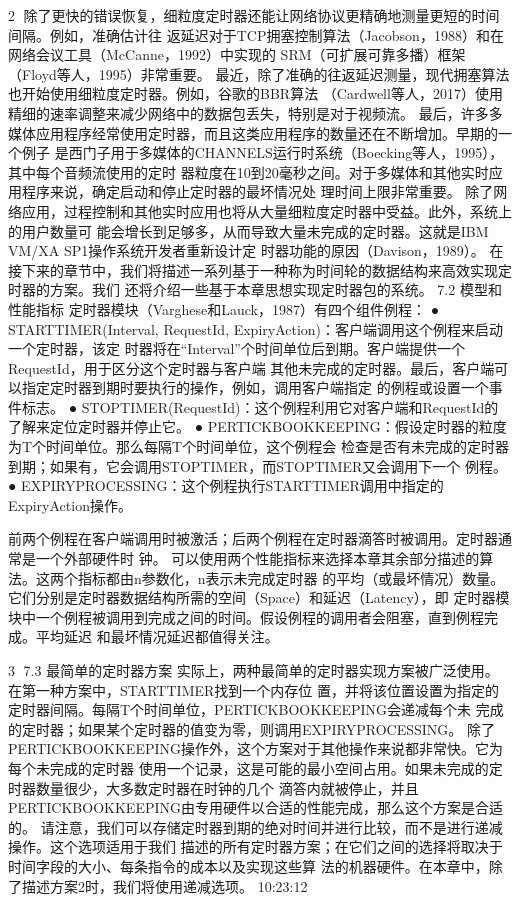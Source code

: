                                                       2
除了更快的错误恢复，细粒度定时器还能让网络协议更精确地测量更短的时间间隔。例如，准确估计往
返延迟对于TCP拥塞控制算法（Jacobson，1988）和在网络会议工具（McCanne，1992）中实现的
SRM（可扩展可靠多播）框架（Floyd等人，1995）非常重要。
最近，除了准确的往返延迟测量，现代拥塞算法也开始使用细粒度定时器。例如，谷歌的BBR算法
（Cardwell等人，2017）使用精细的速率调整来减少网络中的数据包丢失，特别是对于视频流。
最后，许多多媒体应用程序经常使用定时器，而且这类应用程序的数量还在不断增加。早期的一个例子
是西门子用于多媒体的CHANNELS运行时系统（Boecking等人，1995），其中每个音频流使用的定时
器粒度在10到20毫秒之间。对于多媒体和其他实时应用程序来说，确定启动和停止定时器的最坏情况处
理时间上限非常重要。
除了网络应用，过程控制和其他实时应用也将从大量细粒度定时器中受益。此外，系统上的用户数量可
能会增长到足够多，从而导致大量未完成的定时器。这就是IBM VM/XA SP1操作系统开发者重新设计定
时器功能的原因（Davison，1989）。
在接下来的章节中，我们将描述一系列基于一种称为时间轮的数据结构来高效实现定时器的方案。我们
还将介绍一些基于本章思想实现定时器包的系统。
7.2 模型和性能指标
定时器模块（Varghese和Lauck，1987）有四个组件例程：
 ● STARTTIMER(Interval, RequestId, ExpiryAction)：客户端调用这个例程来启动一个定时器，该定
   时器将在“Interval”个时间单位后到期。客户端提供一个RequestId，用于区分这个定时器与客户端
   其他未完成的定时器。最后，客户端可以指定定时器到期时要执行的操作，例如，调用客户端指定
   的例程或设置一个事件标志。
 ● STOPTIMER(RequestId)：这个例程利用它对客户端和RequestId的了解来定位定时器并停止它。
 ● PERTICKBOOKKEEPING：假设定时器的粒度为T个时间单位。那么每隔T个时间单位，这个例程会
   检查是否有未完成的定时器到期；如果有，它会调用STOPTIMER，而STOPTIMER又会调用下一个
   例程。
 ● EXPIRYPROCESSING：这个例程执行STARTTIMER调用中指定的ExpiryAction操作。

前两个例程在客户端调用时被激活；后两个例程在定时器滴答时被调用。定时器通常是一个外部硬件时
钟。
可以使用两个性能指标来选择本章其余部分描述的算法。这两个指标都由n参数化，n表示未完成定时器
的平均（或最坏情况）数量。它们分别是定时器数据结构所需的空间（Space）和延迟（Latency），即
定时器模块中一个例程被调用到完成之间的时间。假设例程的调用者会阻塞，直到例程完成。平均延迟
和最坏情况延迟都值得关注。

                                                                    3
7.3 最简单的定时器方案
实际上，两种最简单的定时器实现方案被广泛使用。在第一种方案中，STARTTIMER找到一个内存位
置，并将该位置设置为指定的定时器间隔。每隔T个时间单位，PERTICKBOOKKEEPING会递减每个未
完成的定时器；如果某个定时器的值变为零，则调用EXPIRYPROCESSING。
除了PERTICKBOOKKEEPING操作外，这个方案对于其他操作来说都非常快。它为每个未完成的定时器
使用一个记录，这是可能的最小空间占用。如果未完成的定时器数量很少，大多数定时器在时钟的几个
滴答内就被停止，并且PERTICKBOOKKEEPING由专用硬件以合适的性能完成，那么这个方案是合适
的。
请注意，我们可以存储定时器到期的绝对时间并进行比较，而不是进行递减操作。这个选项适用于我们
描述的所有定时器方案；在它们之间的选择将取决于时间字段的大小、每条指令的成本以及实现这些算
法的机器硬件。在本章中，除了描述方案2时，我们将使用递减选项。
                          10:23:12




